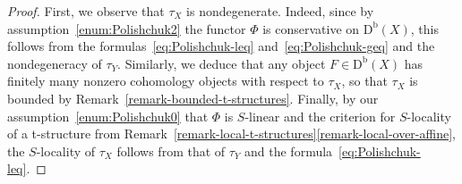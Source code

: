 \documentclass[11pt, reqno]{amsart}
\numberwithin{equation}{section}
\theoremstyle{plain}
\theoremstyle{remark}
\theoremstyle{definition}
\theoremstyle{italicsname}
\newcommand{\Db}{\mathrm{D^b}}
\begin{document}
\begin{proof}
First, we observe that $\tau_X$ is nondegenerate. 
Indeed, since by assumption~\ref{enum:Polishchuk2} the functor $\Phi$ is conservative on $\Db(X)$, this follows from the formulas~\eqref{eq:Polishchuk-leq} and~\eqref{eq:Polishchuk-geq} and the nondegeneracy of $\tau_Y$. 
Similarly, we deduce that any object $F \in \Db(X)$ has finitely many nonzero cohomology objects with respect to $\tau_X$, so that $\tau_X$ is bounded by Remark~\ref{remark-bounded-t-structures}. 
Finally, by our assumption~\ref{enum:Polishchuk0} that $\Phi$ is $S$-linear and the criterion for $S$-locality of a t-structure from Remark~\ref{remark-local-t-structures}\eqref{remark-local-over-affine}, the $S$-locality of $\tau_X$ follows from that of $\tau_Y$ and the formula~\eqref{eq:Polishchuk-leq}.
\end{proof}
\end{document}
